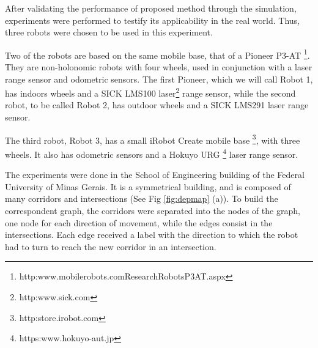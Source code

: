 \documentclass[twocolumn]{svjour3}       %
\begin{document}
After validating the performance of proposed method through the simulation, experiments were performed to testify its applicability in the real world. Thus, three robots were chosen to be used in this experiment.

Two of the robots are based on the same mobile base, that of a Pioneer P3-AT \footnote{http:\/\/www.mobilerobots.com\/ResearchRobots\/P3AT.aspx}. They are non-holonomic robots with four wheels, used in conjunction with a laser range sensor and odometric sensors. The first Pioneer, which we will call Robot 1, has indoors wheels and a SICK LMS100 laser\footnote{http:\/\/www.sick.com} range sensor, while the second robot, to be called Robot 2, has outdoor wheels and a SICK LMS291 laser range sensor. 

The third robot, Robot 3, has a small iRobot Create mobile base \footnote{http:\/\/store.irobot.com}, with three wheels. It also has odometric sensors and a Hokuyo URG \footnote{https:\/\/www.hokuyo-aut.jp} laser range sensor. 

The experiments were done in the School of Engineering building of the Federal University of Minas Gerais. It is a symmetrical building, and is composed of many corridors and intersections (See Fig \ref{fig:depmap} (a)). To build the correspondent graph, the corridors were separated into the nodes of the graph, one node for each direction of movement, while the edges consist in the intersections. Each edge received a label with the direction to which the robot had to turn to reach the new corridor in an intersection. 
\end{document}
